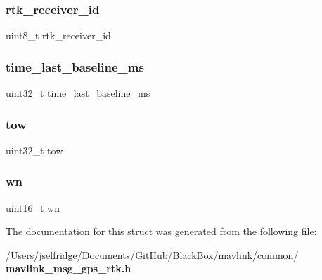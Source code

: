 \subsubsection{rtk\+\_\+receiver\+\_\+id}
{\footnotesize\ttfamily uint8\+\_\+t rtk\+\_\+receiver\+\_\+id}

\mbox{\label{struct____mavlink__gps__rtk__t_ace9146c92158beaf899f15037cc32804}} 
\subsubsection{time\+\_\+last\+\_\+baseline\+\_\+ms}
{\footnotesize\ttfamily uint32\+\_\+t time\+\_\+last\+\_\+baseline\+\_\+ms}

\mbox{\label{struct____mavlink__gps__rtk__t_a136ed1a39cb9d3710ce22aa273d5c3dd}} 
\subsubsection{tow}
{\footnotesize\ttfamily uint32\+\_\+t tow}

\mbox{\label{struct____mavlink__gps__rtk__t_a62daabcc533ecf542f8c21fd16497ee8}} 
\subsubsection{wn}
{\footnotesize\ttfamily uint16\+\_\+t wn}



The documentation for this struct was generated from the following file\+:\begin{DoxyCompactItemize}
\item 
/\+Users/jselfridge/\+Documents/\+Git\+Hub/\+Black\+Box/mavlink/common/\textbf{ mavlink\+\_\+msg\+\_\+gps\+\_\+rtk.\+h}\end{DoxyCompactItemize}
